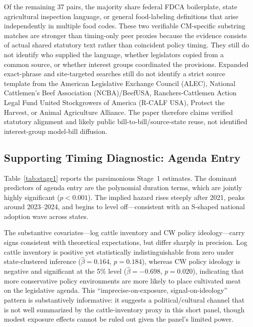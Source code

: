 \documentclass[12pt]{article}
\begin{document}
Of the remaining 37 pairs, the majority share federal FDCA boilerplate, state agricultural inspection language, or general food-labeling definitions that arise independently in multiple food codes.  These two verifiable CM-specific substring matches are stronger than timing-only peer proxies because the evidence consists of actual shared statutory text rather than coincident policy timing.  They still do not identify who supplied the language, whether legislators copied from a common source, or whether interest groups coordinated the provisions.  Expanded exact-phrase and site-targeted searches still do not identify a strict source template from the American Legislative Exchange Council (ALEC), National Cattlemen's Beef Association (NCBA)/BeefUSA, Ranchers-Cattlemen Action Legal Fund United Stockgrowers of America (R-CALF USA), Protect the Harvest, or Animal Agriculture Alliance.  The paper therefore claims verified statutory alignment and likely public bill-to-bill/source-state reuse, not identified interest-group model-bill diffusion.

\subsection{Supporting Timing Diagnostic: Agenda Entry}

Table~\ref{tab:stage1} reports the parsimonious Stage~1 estimates.  The dominant predictors of agenda entry are the polynomial duration terms, which are jointly highly significant ($p < 0.001$).  The implied hazard rises steeply after 2021, peaks around 2023--2024, and begins to level off---consistent with an S-shaped national adoption wave across states.

The substantive covariates---log cattle inventory and CW policy ideology---carry signs consistent with theoretical expectations, but differ sharply in precision.  Log cattle inventory is positive yet statistically indistinguishable from zero under state-clustered inference ($\hat{\beta} = 0.164$, $p = 0.184$), whereas CW policy ideology is negative and significant at the 5\% level ($\hat{\beta} = -0.698$, $p = 0.020$), indicating that more conservative policy environments are more likely to place cultivated meat on the legislative agenda.  This ``imprecise-on-exposure, signal-on-ideology'' pattern is substantively informative: it suggests a political/cultural channel that is not well summarized by the cattle-inventory proxy in this short panel, though modest exposure effects cannot be ruled out given the panel's limited power.
\end{document}

